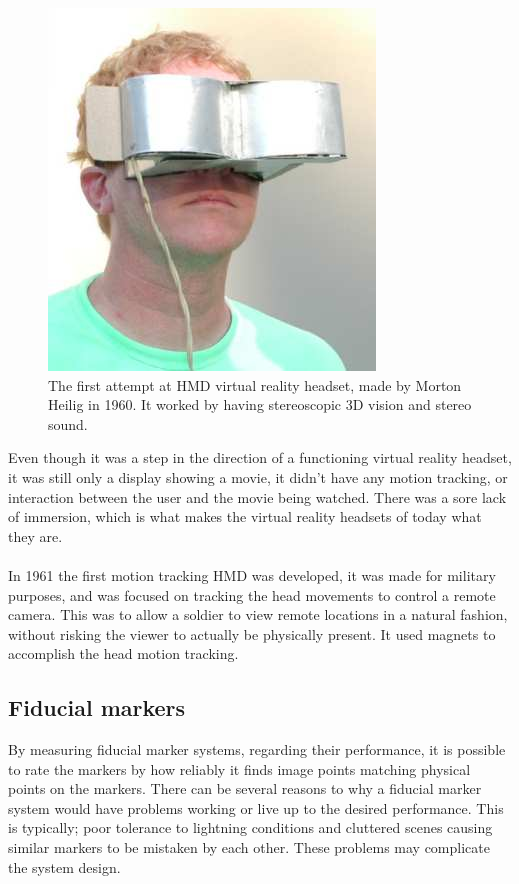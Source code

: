 			\begin{figure}[H]
				\centering
				\includegraphics[width=0.25\linewidth]{figure/Analysis/TelesphereMask}
				\caption{The first attempt at HMD virtual reality headset, made by Morton Heilig in 1960. It worked by having stereoscopic 3D vision and stereo sound.}
				\label{fig:telesphere}
			\end{figure}
			Even though it was a step in the direction of a functioning virtual reality headset, it was still only a display showing a movie, it didn't have any motion tracking, or interaction between the user and the movie being watched. There was a sore lack of immersion, which is what makes the virtual reality headsets of today what they are.\\\\

			In 1961 the first motion tracking HMD was developed\cite{VRS}, it was made for military purposes, and was focused on tracking the head movements to control a remote camera. This was to allow a soldier to view remote locations in a natural fashion, without risking the viewer to actually be physically present. It used magnets to accomplish the head motion tracking.

			
			\subsection{Fiducial markers}\label{sec:fiducialMarkers}
				By measuring fiducial marker systems, regarding their performance, it is possible to rate the markers by how reliably it finds image points matching physical points on the markers. There can be several reasons to why a fiducial marker system would have problems working or live up to the desired performance. This is typically; poor tolerance to lightning conditions and cluttered scenes causing similar markers to be mistaken by each other\cite{fiducialMarkers}. These problems may complicate the system design.\\
				
